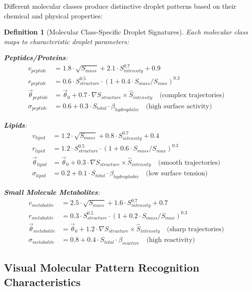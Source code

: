 \documentclass[12pt,a4paper]{article}
\newtheorem{definition}{Definition}
\begin{document}
Different molecular classes produce distinctive droplet patterns based on their chemical and physical properties:

\begin{definition}[Molecular Class-Specific Droplet Signatures]
Each molecular class maps to characteristic droplet parameters:

\textbf{Peptides/Proteins}:
\begin{align}
v_{peptide} &= 1.8 \cdot \sqrt{S_{mass}} + 2.1 \cdot S_{intensity}^{0.7} + 0.9 \\
r_{peptide} &= 0.6 \cdot S_{structure}^{0.5} \cdot (1 + 0.4 \cdot S_{mass}/S_{max})^{0.3} \\
\vec{\theta}_{peptide} &= \vec{\theta}_0 + 0.7 \cdot \nabla S_{structure} \times \hat{S}_{intensity} \quad \text{(complex trajectories)} \\
\sigma_{peptide} &= 0.6 + 0.3 \cdot S_{total} \cdot \beta_{hydrophilic} \quad \text{(high surface activity)}
\end{align}

\textbf{Lipids}:
\begin{align}
v_{lipid} &= 1.2 \cdot \sqrt{S_{mass}} + 0.8 \cdot S_{intensity}^{0.7} + 0.4 \\
r_{lipid} &= 1.2 \cdot S_{structure}^{0.5} \cdot (1 + 0.6 \cdot S_{mass}/S_{max})^{0.3} \\
\vec{\theta}_{lipid} &= \vec{\theta}_0 + 0.3 \cdot \nabla S_{structure} \times \hat{S}_{intensity} \quad \text{(smooth trajectories)} \\
\sigma_{lipid} &= 0.2 + 0.1 \cdot S_{total} \cdot \beta_{hydrophobic} \quad \text{(low surface tension)}
\end{align}

\textbf{Small Molecule Metabolites}:
\begin{align}
v_{metabolite} &= 2.5 \cdot \sqrt{S_{mass}} + 1.6 \cdot S_{intensity}^{0.7} + 0.7 \\
r_{metabolite} &= 0.3 \cdot S_{structure}^{0.5} \cdot (1 + 0.2 \cdot S_{mass}/S_{max})^{0.3} \\
\vec{\theta}_{metabolite} &= \vec{\theta}_0 + 1.2 \cdot \nabla S_{structure} \times \hat{S}_{intensity} \quad \text{(sharp trajectories)} \\
\sigma_{metabolite} &= 0.8 + 0.4 \cdot S_{total} \cdot \beta_{reactive} \quad \text{(high reactivity)}
\end{align}
\end{definition}

\subsection{Visual Molecular Pattern Recognition Characteristics}
\end{document}
